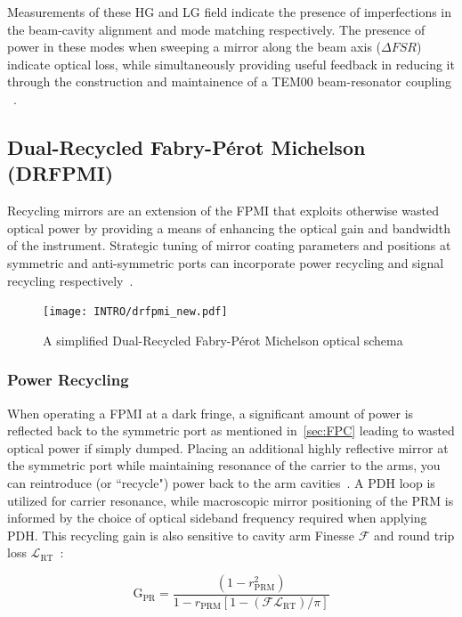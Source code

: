 \newpage 
Measurements of these HG and LG field indicate the presence of imperfections in the beam-cavity alignment and mode matching respectively. The presence of power in these modes when sweeping a mirror along the beam axis ($\Delta FSR$) indicate optical loss, while simultaneously providing useful feedback in reducing it through the construction and maintainence of a TEM00 beam-resonator coupling ~\cite{anderson:1984}. 

\subsection{Dual-Recycled Fabry-P\'erot Michelson (DRFPMI)}
Recycling mirrors are an extension of the FPMI that exploits otherwise wasted optical power by providing a means of enhancing the optical gain and bandwidth of the instrument. Strategic tuning of mirror coating parameters and positions at symmetric and anti-symmetric ports can incorporate power recycling and signal recycling respectively~\cite{meers:1988}.

\begin{figure}[ht!]
\begin{center}
\texttt{[image: INTRO/drfpmi\_new.pdf]}
\end{center}
\caption{A simplified Dual-Recycled Fabry-P\'erot Michelson optical schema}
\label{fig:drfp_michelson}
\end{figure}

\subsubsection{Power Recycling}
When operating a FPMI at a dark fringe, a significant amount of power is reflected back to the symmetric port as mentioned in~\autoref{sec:FPC} leading to wasted optical power if simply dumped. Placing an additional highly reflective mirror at the symmetric port while maintaining resonance of the carrier to the arms, you can reintroduce (or ``recycle") power back to the arm cavities~\cite{abbott:2009}. A PDH loop is utilized for carrier resonance, while macroscopic mirror positioning of the PRM is informed by the choice of optical sideband frequency required when applying PDH. This recycling gain is also sensitive to cavity arm Finesse $\mathscr{F}$ and round trip loss $\mathscr{L}_\mathrm{RT}$~\cite{Vajente:2018_unpub}: 

\begin{equation}\label{eq:PRG}
	\mathrm{G_{PR}} = \frac{(1-r_\mathrm{PRM}^2)}{1-r_\mathrm{PRM}[1- (\mathscr{F} \mathscr{L}_\mathrm{RT})/ \pi]}
\end{equation}

